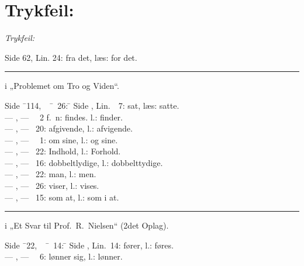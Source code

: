 \chapter*{Trykfeil:}

 \begin{center}
\emph{Trykfeil:}
\end{center}

\noindent Side 62, Lin. 24: fra det, læs: for det.

\begin{center}\rule{2cm}{0.4pt}\end{center}

\begin{center}
i „Problemet om Tro og Viden“.
\end{center}

\noindent
\begin{tabbing}
Side \=\ 114,\ \ \=\ \ 26: \=\kill
Side , \> Lin.\ \ 7: \> sat, læs: satte.\\
--- , \> --- \ \ 2 f.\ n: \> findes. l.: finder.\\
--- , \> --- \ 20: \> afgivende, l.: afvigende.\\
--- , \> --- \ \ 1: \> om sine, l.: og sine.\\
--- , \> --- \ 22: \> Indhold, l.: Forhold.\\
--- , \> --- \ 16: \> dobbeltlydige, l.: dobbelttydige.\\
--- , \> --- \ 22: \> man, l.: men.\\
--- , \> --- \ 26: \> viser, l.: vises.\\
--- , \> --- \ 15: \> som at, l.: som i at.
\end{tabbing}

\begin{center}\rule{2cm}{0.4pt}\end{center}

\begin{center}
i „Et Svar til Prof.\ R.\ Nielsen“ (2det Oplag).
\end{center}

\noindent
\begin{tabbing}
Side \=\ 22,\ \ \=\ \ 14: \=\kill
Side , \> Lin.\ 14: \> fører, l.: føres.\\
--- , \> --- \ \ 6: \> lønner sig, l.: lønner.
\end{tabbing}


